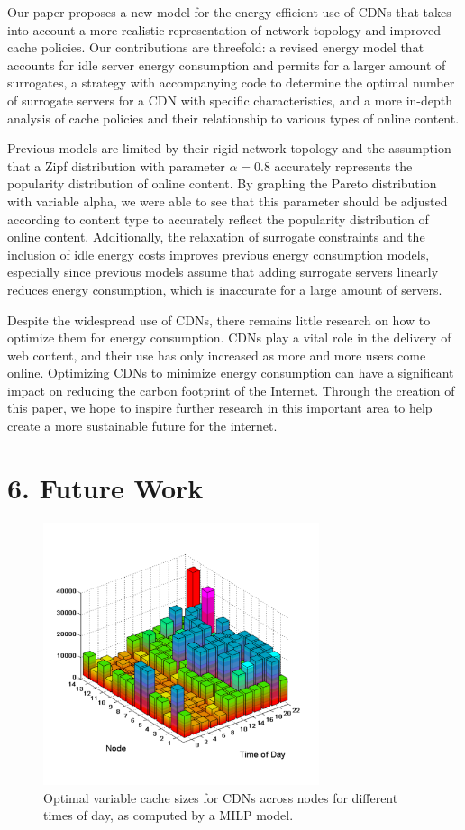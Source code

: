 \documentclass[
	a4paper, %
	10pt, %
	unnumberedsections, %
	twoside, %
]{LTJournalArticle}
\begin{document}
Our paper proposes a new model for the energy-efficient use of CDNs that takes into account a more realistic representation of network topology and improved cache policies. Our contributions are threefold:  a revised energy model that accounts for idle server energy consumption and permits for a larger amount of surrogates, a strategy with accompanying code to determine the optimal number of surrogate servers for a CDN with specific characteristics, and a more in-depth analysis of cache policies and their relationship to various types of online content.

Previous models are limited by their rigid network topology and the assumption that a Zipf distribution with parameter $\alpha=0.8$ accurately represents the popularity distribution of online content. By graphing the Pareto distribution with variable alpha, we were able to see that this parameter should be adjusted according to content type to accurately reflect the popularity distribution of online content. Additionally, the relaxation of surrogate constraints and the inclusion of idle energy costs improves previous energy consumption models, especially since previous models assume that adding surrogate servers linearly reduces energy consumption, which is inaccurate for a large amount of servers.

Despite the widespread use of CDNs, there remains little research on how to optimize them for energy consumption. CDNs play a vital role in the delivery of web content, and their use has only increased as more and more users come online. Optimizing CDNs to minimize energy consumption can have a significant impact on reducing the carbon footprint of the Internet. Through the creation of this paper, we hope to inspire further research in this important area to help create a more sustainable future for the internet. 

\section{6. Future Work}

\begin{figure}[h]
	\begin{center}
		\includegraphics[width=8.1cm]{milp.png}
	\end{center}
	\caption{Optimal variable cache sizes for CDNs across nodes for different times of day, as computed by a MILP model.}	
\end{figure}
\end{document}
